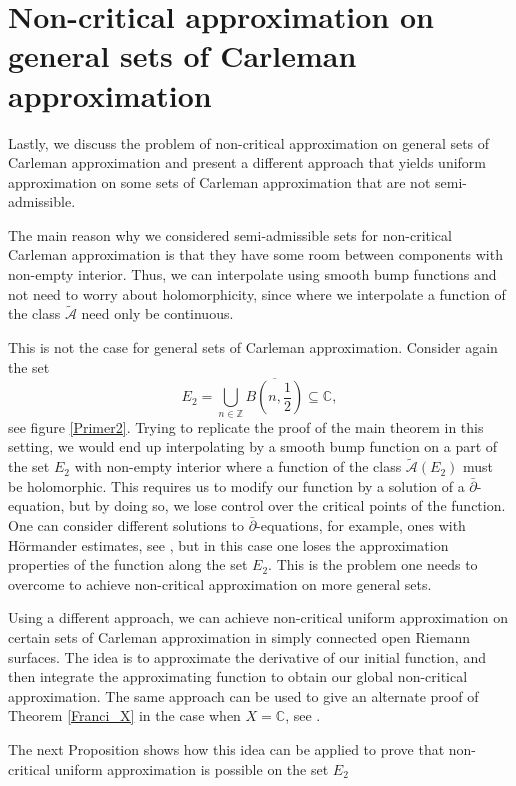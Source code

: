\documentclass[a4paper,11pt]{amsart}
\newcommand{\Z}{\mathbb Z}
\newcommand{\C}{\mathbb C}
\begin{document}
\section{Non-critical approximation on general sets of Carleman approximation} \label{Uniform}

Lastly, we discuss the problem of non-critical approximation on general sets of Carleman approximation and present a different approach 
that yields uniform approximation on some sets of Carleman approximation that are not semi-admissible.

The main reason why we considered semi-admissible sets for non-critical Carleman approximation is that
they have some room between components with non-empty interior. 
Thus, we can interpolate using smooth bump functions and not need to worry about holomorphicity, 
since where we interpolate a function of the class $\widetilde{\mathcal{A}}$ need only be continuous. 

This is not the case for general sets of Carleman approximation. Consider again the set 
\[E_2 = \bigcup_{n \in \Z} \overline{B\left(n, \frac{1}{2}\right)} \subseteq \C,\]
see figure \ref{Primer2}.
Trying to replicate the proof of the main theorem in this setting, 
we would end up interpolating by a smooth bump function on a part of the set $E_2$ with non-empty interior where a function of the class $\widetilde{\mathcal{A}}(E_2)$ must be holomorphic.
This requires us to modify our function by a solution of a $\bar{\partial}$-equation, but by doing so, we lose control over the critical points of the function.
One can consider different solutions to $\bar{\partial}$-equations, for example, ones with Hörmander estimates, see \cite[Section 4.2]{Hormander}, but in this case one loses the approximation properties of the function along the set $E_2$. 
This is the problem one needs to overcome to achieve non-critical approximation on more general sets.

Using a different approach, we can achieve non-critical uniform approximation on certain sets of Carleman approximation in simply connected open Riemann surfaces. 
The idea is to approximate the derivative of our initial function, and then integrate the approximating function to obtain our global non-critical approximation.
The same approach can be used to give an alternate proof of Theorem \ref{Franci_X} in the case when $X = \C$, see \cite[Theorem 3.1]{franc}.

The next Proposition shows how this idea can be applied to prove that non-critical uniform approximation is possible on the set $E_2$
\end{document}
